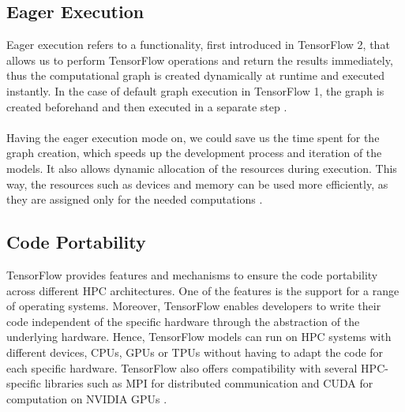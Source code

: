 \documentclass[ieeetran]{article}
\begin{document}
\subsection{Eager Execution} %
\label{sub:eager_execution}
Eager execution refers to a functionality, first introduced in TensorFlow 2, that allows us to perform TensorFlow operations and return the results immediately, thus the computational graph is created dynamically at runtime and executed instantly. In the case of default graph execution in TensorFlow 1, the graph is created beforehand and then executed in a separate step \cite{fourth}. 
\\ \\Having the eager execution mode on, we could save us the time spent for the graph creation, which speeds up the development process and iteration of the models. It also allows dynamic allocation of the resources during execution. This way, the resources such as devices and memory can be used more efficiently, as they are assigned only for the needed computations \cite{fourth}.

\subsection{Code Portability} %
\label{sub:code_portability}
TensorFlow provides features and mechanisms to ensure the code portability across different HPC architectures. One of the features is the support for a range of operating systems. Moreover, TensorFlow enables developers to write their code independent of the specific hardware through the abstraction of the underlying hardware. Hence, TensorFlow models can run on HPC systems with different devices, CPUs, GPUs or TPUs without having to adapt the code for each specific hardware. TensorFlow also offers compatibility with several HPC-specific libraries such as MPI for distributed communication and CUDA for computation on NVIDIA GPUs \cite{fifth}.
\end{document}
